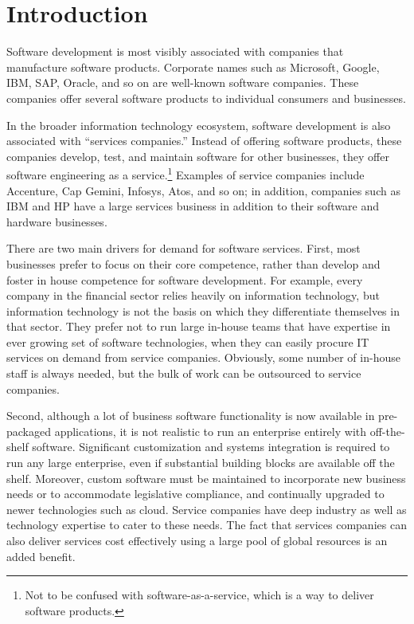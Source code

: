 \section{Introduction}
\label{sec:intro}

Software development is most visibly associated with companies that manufacture
software products.  Corporate names such as Microsoft, Google, IBM, SAP, Oracle,
and so on are well-known software companies.  These companies offer several
software products to individual consumers and businesses.

In the broader information technology ecosystem, software development is also
associated with ``services companies.''  Instead of offering software products,
these companies develop, test, and maintain software for other businesses, \ie
they offer software engineering as a service.\footnote{\small Not to be confused
  with software-as-a-service, which is a way to deliver software products.}
Examples of service companies include Accenture, Cap Gemini, Infosys, Atos, and
so on; in addition, companies such as IBM and HP have a large services business
in addition to their software and hardware businesses.

There are two main drivers for demand for software services.  First, most
businesses prefer to focus on their core competence, rather than develop and
foster in house competence for software development.  For example, every company
in the financial sector relies heavily on information technology, but
information technology is not the basis on which they differentiate themselves
in that sector. They prefer not to run large in-house teams that have expertise
in ever growing set of software technologies, when they can easily procure IT
services on demand from service companies. Obviously, some number of in-house
staff is always needed, but the bulk of work can be outsourced to service
companies.

Second, although a lot of business software functionality is now available in
pre-packaged applications, it is not realistic to run an enterprise entirely
with off-the-shelf software. Significant custom\-ization and systems integration
is required to run any large enterprise, even if substantial building blocks are
available off the shelf. Moreover, custom software must be maintained to
incorporate new business needs or to accommodate legislative compliance, and
continually upgraded to newer technologies such as cloud. Service companies have
deep industry as well as technology expertise to cater to these needs. The fact
that services companies can also deliver services cost effectively using a large
pool of global resources is an added benefit.

